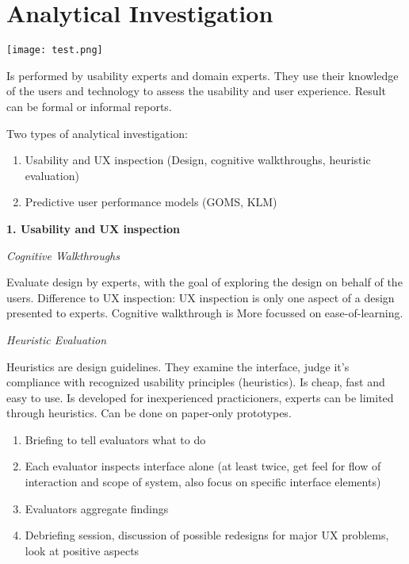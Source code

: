 \section{Analytical Investigation}

\begin{center}
	\texttt{[image: test.png]}
\end{center}

Is performed by usability experts and domain experts. They use their knowledge of the users and technology to assess the usability and user experience. Result can be formal or informal reports. 
\smallskip

Two types of analytical investigation: 

\begin{enumerate}
    \item Usability and UX inspection (Design, cognitive walkthroughs, heuristic evaluation)
    \item Predictive user performance models (GOMS, KLM)
\end{enumerate}

\medskip

\columnbreak

\textbf{1. Usability and UX inspection} \smallskip

\textit{Cognitive Walkthroughs} \smallskip

Evaluate design by experts, with the goal of exploring the design on behalf of the users.
Difference to UX inspection: UX inspection is only one aspect of a design presented to experts. Cognitive walkthrough is More focussed on ease-of-learning.  \medskip

\textit{Heuristic Evaluation} \smallskip

Heuristics are design guidelines. 
They examine the interface, judge it's compliance with recognized usability principles (heuristics).
Is cheap, fast and easy to use. Is developed for inexperienced practicioners, experts can be limited through heuristics. Can be done on paper-only prototypes. \smallskip


\begin{enumerate}
    \item Briefing to tell evaluators what to do
    \item Each evaluator inspects interface alone (at least twice, get feel for flow of interaction and scope of system, also focus on specific interface elements)
    \item Evaluators aggregate findings
    \item Debriefing session, discussion of possible redesigns for major UX problems, look at positive aspects
\end{enumerate}


